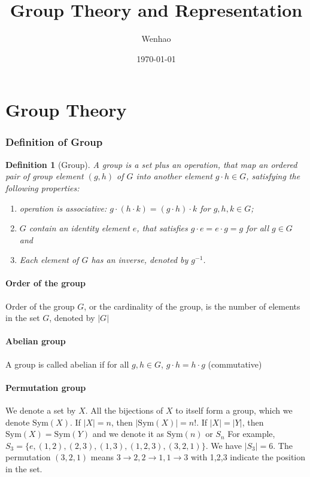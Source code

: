 \documentclass{amsart}
\newtheorem{definition}{Definition}
\begin{document}
\title{Group Theory and Representation}
\author{Wenhao}
\date{\today}
\maketitle

\part{Group Theory}

\section{Definition of Group}
\begin{definition}[Group]
    A group is a set plus an operation, that map an ordered pair of group element $(g,h)$ of $G$ into another element $g\cdot h \in G$, satisfying
    the following properties:
    \begin{enumerate}
        \item operation is associative: $g\cdot (h \cdot k) = (g\cdot h) \cdot k$ for $g,h,k \in G$;
        \item $G$ contain an identity element $e$, that satisfies $g\cdot e = e\cdot g = g$ for all $g \in G$ and 
        \item Each element of $G$ has an inverse, denoted by $g^{-1}$.
    \end{enumerate}  
\end{definition}

\subsection*{Order of the group}
    Order of the group $G$, or the cardinality of the group, is the number of elements in the set $G$, denoted by $|G|$

\subsection*{Abelian group}
    A group is called abelian if for all $g, h \in G$, $g\cdot h = h \cdot g$ (commutative)

\vspace{10pt}

\subsection*{Permutation group}
We denote a set by $X$. All the bijections of $X$ to itself form a group, which we denote $\text{Sym}(X)$. 
If $|X| = n$, then $|\text{Sym}(X)| = n!$.
If $|X| = |Y|$, then $\text{Sym}(X) = \text{Sym}(Y)$ and we denote it as $\text{Sym}(n)$ or $S_n$
For example, $S_3 = \{ e, (1,2), (2,3), (1,3), (1,2,3), (3,2,1) \}$. We have $|S_3| = 6$. 
The permutation $(3,2,1)$ means $3\to 2, 2\to 1, 1\to 3$ with 1,2,3 indicate the position in the set.
\end{document}
